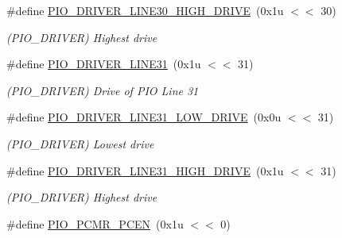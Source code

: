 \begin{DoxyCompactItemize}
\mbox{\label{group__SAME70__PIO_gab1f1fcab713fb084799f4213dfffbdaa}} 
\#define \mbox{\hyperlink{group__SAME70__PIO_gab1f1fcab713fb084799f4213dfffbdaa}{P\+I\+O\+\_\+\+D\+R\+I\+V\+E\+R\+\_\+\+L\+I\+N\+E30\+\_\+\+H\+I\+G\+H\+\_\+\+D\+R\+I\+VE}}~(0x1u $<$$<$ 30)
\begin{DoxyCompactList}\small\item\em (P\+I\+O\+\_\+\+D\+R\+I\+V\+ER) Highest drive \end{DoxyCompactList}\item 
\mbox{\label{group__SAME70__PIO_ga22039ac566e53ad44d64ba417c8c6b60}} 
\#define \mbox{\hyperlink{group__SAME70__PIO_ga22039ac566e53ad44d64ba417c8c6b60}{P\+I\+O\+\_\+\+D\+R\+I\+V\+E\+R\+\_\+\+L\+I\+N\+E31}}~(0x1u $<$$<$ 31)
\begin{DoxyCompactList}\small\item\em (P\+I\+O\+\_\+\+D\+R\+I\+V\+ER) Drive of P\+IO Line 31 \end{DoxyCompactList}\item 
\mbox{\label{group__SAME70__PIO_ga0f5d8315c7015643fdf5877319b0c4db}} 
\#define \mbox{\hyperlink{group__SAME70__PIO_ga0f5d8315c7015643fdf5877319b0c4db}{P\+I\+O\+\_\+\+D\+R\+I\+V\+E\+R\+\_\+\+L\+I\+N\+E31\+\_\+\+L\+O\+W\+\_\+\+D\+R\+I\+VE}}~(0x0u $<$$<$ 31)
\begin{DoxyCompactList}\small\item\em (P\+I\+O\+\_\+\+D\+R\+I\+V\+ER) Lowest drive \end{DoxyCompactList}\item 
\mbox{\label{group__SAME70__PIO_gaf26b819dcd145ed0e4d8e5cbc60bb22c}} 
\#define \mbox{\hyperlink{group__SAME70__PIO_gaf26b819dcd145ed0e4d8e5cbc60bb22c}{P\+I\+O\+\_\+\+D\+R\+I\+V\+E\+R\+\_\+\+L\+I\+N\+E31\+\_\+\+H\+I\+G\+H\+\_\+\+D\+R\+I\+VE}}~(0x1u $<$$<$ 31)
\begin{DoxyCompactList}\small\item\em (P\+I\+O\+\_\+\+D\+R\+I\+V\+ER) Highest drive \end{DoxyCompactList}\item 
\mbox{\label{group__SAME70__PIO_ga71d58c9bab76cc2366b5982453b0957a}} 
\#define \mbox{\hyperlink{group__SAME70__PIO_ga71d58c9bab76cc2366b5982453b0957a}{P\+I\+O\+\_\+\+P\+C\+M\+R\+\_\+\+P\+C\+EN}}~(0x1u $<$$<$ 0)
$$
\end{DoxyCompactItemize}
